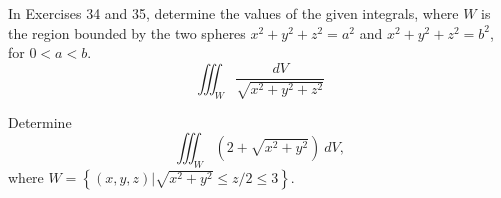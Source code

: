 \documentclass[boxes]{gsypset}
\newcommand{\pn}[1]{\left(#1\right)}
\newcommand{\cbk}[1]{\left\{#1\right\}}
\newcommand{\s}[1]{\sqrt{#1}}
\newcommand{\f}[2]{\frac{#1}{#2}}
\begin{document}
\begin{problem}[Colley 5.5.34]
	In Exercises 34 and 35, determine the values of the given
	integrals, where $W$ is the region bounded by the two spheres
	$x^2+y^2+z^2=a^2$ and $x^2+y^2+z^2=b^2$, for $0<a<b$.
	\[
		\iiint_W\f{dV}{\s{x^2+y^2+z^2}}
	\]
\end{problem}
\begin{solution}
	
\end{solution}

\begin{problem}[Colley 5.5.38]
	Determine
	\[
		\iiint_W\pn{2+\s{x^2+y^2}}~dV,
	\]
	where $W=\cbk{(x,y,z)|\s{x^2+y^2}\leq z/2\leq3}$.
\end{problem}
\begin{solution}
	
\end{solution}
\end{document}
